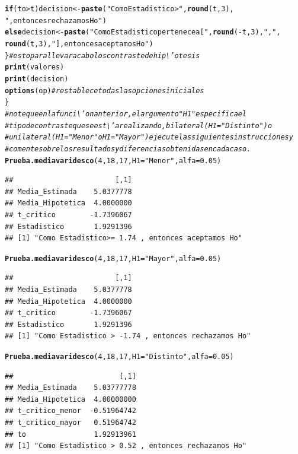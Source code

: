 \documentclass[12pt,letterpaper]{article}\usepackage[]{graphicx}\usepackage[]{color}
\makeatletter
\newcommand{\hlnum}[1]{\textcolor[rgb]{0.686,0.059,0.569}{#1}}%
\newcommand{\hlstr}[1]{\textcolor[rgb]{0.192,0.494,0.8}{#1}}%
\newcommand{\hlcom}[1]{\textcolor[rgb]{0.678,0.584,0.686}{\textit{#1}}}%
\newcommand{\hlopt}[1]{\textcolor[rgb]{0,0,0}{#1}}%
\newcommand{\hlstd}[1]{\textcolor[rgb]{0.345,0.345,0.345}{#1}}%
\newcommand{\hlkwa}[1]{\textcolor[rgb]{0.161,0.373,0.58}{\textbf{#1}}}%
\newcommand{\hlkwb}[1]{\textcolor[rgb]{0.69,0.353,0.396}{#1}}%
\newcommand{\hlkwc}[1]{\textcolor[rgb]{0.333,0.667,0.333}{#1}}%
\newcommand{\hlkwd}[1]{\textcolor[rgb]{0.737,0.353,0.396}{\textbf{#1}}}%
\newenvironment{kframe}{%
 \def\at@end@of@kframe{}%
 \ifinner\ifhmode%
  \def\at@end@of@kframe{\end{minipage}}%
  \begin{minipage}{\columnwidth}%
 \fi\fi%
 \def\FrameCommand##1{\hskip\@totalleftmargin \hskip-\fboxsep
 \colorbox{shadecolor}{##1}\hskip-\fboxsep
     \hskip-\linewidth \hskip-\@totalleftmargin \hskip\columnwidth}%
 \MakeFramed {\advance\hsize-\width
   \@totalleftmargin\z@ \linewidth\hsize
   \@setminipage}}%
 {\par\unskip\endMakeFramed%
 \at@end@of@kframe}
\newenvironment{knitrout}{}{} %
\makeatother
\begin{document}
\begin{knitrout}
\begin{kframe}
\begin{alltt}
 \hlkwa{if} \hlstd{(to} \hlopt{>} \hlstd{t) decision} \hlkwb{<-} \hlkwd{paste}\hlstd{(}\hlstr{"Como Estadistico >"}\hlstd{,} \hlkwd{round}\hlstd{(t,}\hlnum{3}\hlstd{),}
                               \hlstr{", entonces rechazamos Ho"}\hlstd{)}
 \hlkwa{else} \hlstd{decision} \hlkwb{<-} \hlkwd{paste}\hlstd{(}\hlstr{"Como Estadistico pertenece a ["}\hlstd{,} \hlkwd{round}\hlstd{(}\hlopt{-}\hlstd{t,}\hlnum{3}\hlstd{),} \hlstr{","}\hlstd{,}
\hlkwd{round}\hlstd{(t,}\hlnum{3}\hlstd{),} \hlstr{"], entonces aceptamos Ho"}\hlstd{)}
\hlstd{\}} \hlcom{# esto para llevar a cabo los contraste de hip\textbackslash{}'otesis }
\hlkwd{print}\hlstd{(valores)}
\hlkwd{print}\hlstd{(decision)}
\hlkwd{options}\hlstd{(op)} \hlcom{# restablece todas las opciones iniciales }
\hlstd{\}}
\hlcom{# note que en la funci\textbackslash{}'on anterior, el argumento "H1" especifica el }
\hlcom{# tipo de contraste que se est\textbackslash{}'a realizando, bilateral (H1= "Distinto") o }
\hlcom{# unilateral (H1= "Menor" o H1= "Mayor") ejecute las siguientes instrucciones y }
\hlcom{# comente sobre los resultados y diferencias obtenidas en cada caso. }
\hlkwd{Prueba.mediavaridesco} \hlstd{(}\hlnum{4}\hlstd{,} \hlnum{18}\hlstd{,} \hlnum{17}\hlstd{,} \hlkwc{H1}\hlstd{=}\hlstr{"Menor"}\hlstd{,} \hlkwc{alfa}\hlstd{=}\hlnum{0.05}\hlstd{)}
\end{alltt}
\begin{verbatim}
##                        [,1]
## Media_Estimada    5.0377778
## Media_Hipotetica  4.0000000
## t_critico        -1.7396067
## Estadistico       1.9291396
## [1] "Como Estadistico>= 1.74 , entonces aceptamos Ho"
\end{verbatim}
\begin{alltt}
\hlkwd{Prueba.mediavaridesco} \hlstd{(}\hlnum{4}\hlstd{,} \hlnum{18}\hlstd{,} \hlnum{17}\hlstd{,} \hlkwc{H1}\hlstd{=}\hlstr{"Mayor"}\hlstd{,} \hlkwc{alfa}\hlstd{=}\hlnum{0.05}\hlstd{)}
\end{alltt}
\begin{verbatim}
##                        [,1]
## Media_Estimada    5.0377778
## Media_Hipotetica  4.0000000
## t_critico        -1.7396067
## Estadistico       1.9291396
## [1] "Como Estadistico > -1.74 , entonces rechazamos Ho"
\end{verbatim}
\begin{alltt}
\hlkwd{Prueba.mediavaridesco} \hlstd{(}\hlnum{4}\hlstd{,} \hlnum{18}\hlstd{,} \hlnum{17}\hlstd{,} \hlkwc{H1}\hlstd{=}\hlstr{"Distinto"}\hlstd{,} \hlkwc{alfa}\hlstd{=}\hlnum{0.05}\hlstd{)}
\end{alltt}
\begin{verbatim}
##                         [,1]
## Media_Estimada    5.03777778
## Media_Hipotetica  4.00000000
## t_critico_menor  -0.51964742
## t_critico_mayor   0.51964742
## to                1.92913961
## [1] "Como Estadistico > 0.52 , entonces rechazamos Ho"
\end{verbatim}
\end{kframe}
\end{knitrout}
  
\end{document}
